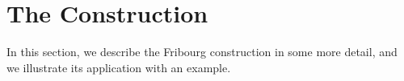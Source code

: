 





\section{The Construction}
\label{3_construction}
In this section, we describe the Fribourg construction in some more detail, and we illustrate its application with an example. 


